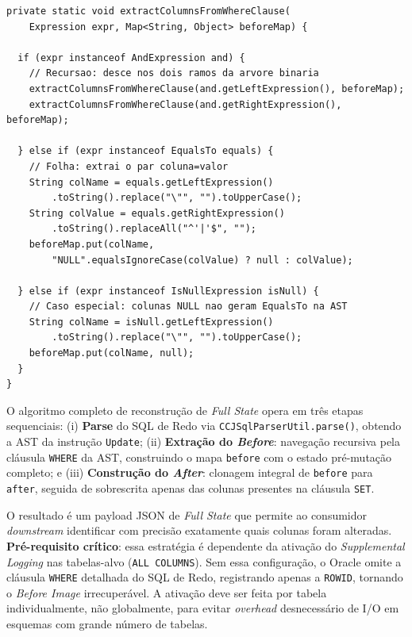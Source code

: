 \documentclass[12pt]{article}
\begin{document}
\begin{lstlisting}[style=javastyle,
  caption={Extração recursiva do \textit{Before Image} via padrão \textit{Visitor} sobre a AST.},
  label={lst:visitor}]
private static void extractColumnsFromWhereClause(
    Expression expr, Map<String, Object> beforeMap) {

  if (expr instanceof AndExpression and) {
    // Recursao: desce nos dois ramos da arvore binaria
    extractColumnsFromWhereClause(and.getLeftExpression(), beforeMap);
    extractColumnsFromWhereClause(and.getRightExpression(), beforeMap);

  } else if (expr instanceof EqualsTo equals) {
    // Folha: extrai o par coluna=valor
    String colName = equals.getLeftExpression()
        .toString().replace("\"", "").toUpperCase();
    String colValue = equals.getRightExpression()
        .toString().replaceAll("^'|'$", "");
    beforeMap.put(colName,
        "NULL".equalsIgnoreCase(colValue) ? null : colValue);

  } else if (expr instanceof IsNullExpression isNull) {
    // Caso especial: colunas NULL nao geram EqualsTo na AST
    String colName = isNull.getLeftExpression()
        .toString().replace("\"", "").toUpperCase();
    beforeMap.put(colName, null);
  }
}
\end{lstlisting}

O algoritmo completo de reconstrução de \textit{Full State} opera em três
etapas sequenciais: (i) \textbf{Parse} do SQL de Redo via
\texttt{CCJSqlParserUtil.parse()}, obtendo a AST da instrução
\texttt{Update}; (ii) \textbf{Extração do \textit{Before}}: navegação
recursiva pela cláusula \texttt{WHERE} da AST, construindo o mapa
\texttt{before} com o estado pré-mutação completo; e
(iii) \textbf{Construção do \textit{After}}: clonagem integral de
\texttt{before} para \texttt{after}, seguida de sobrescrita apenas das
colunas presentes na cláusula \texttt{SET}.

O resultado é um payload JSON de \textit{Full State} que permite ao
consumidor \textit{downstream} identificar com precisão exatamente quais
colunas foram alteradas. \textbf{Pré-requisito crítico}: essa estratégia
é dependente da ativação do \textit{Supplemental Logging} nas tabelas-alvo
(\texttt{ALL COLUMNS}). Sem essa configuração, o Oracle omite a cláusula
\texttt{WHERE} detalhada do SQL de Redo, registrando apenas a \texttt{ROWID},
tornando o \textit{Before Image} irrecuperável. A ativação deve ser feita
por tabela individualmente, não globalmente, para evitar
\textit{overhead} desnecessário de I/O em esquemas com grande número de
tabelas.
\end{document}
